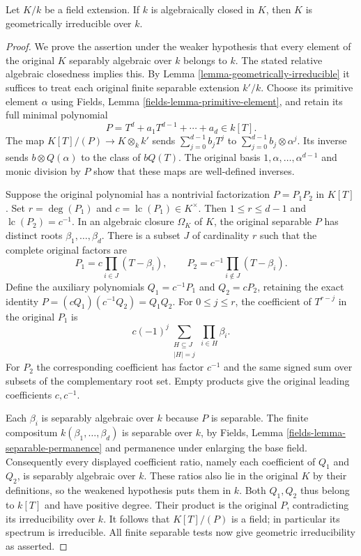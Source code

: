 \begin{lemma}
\label{lemma-field-extension-geometrically-irreducible}
Let $K/k$ be a field extension. If $k$ is algebraically closed in $K$, then
$K$ is geometrically irreducible over $k$.
\end{lemma}

\begin{proof}
We prove the assertion under the weaker
hypothesis that every element of the
original $K$ separably algebraic over
$k$ belongs to $k$. The stated relative
algebraic closedness implies this.
By Lemma \ref{lemma-geometrically-irreducible}
it suffices to treat each original
finite separable extension $k'/k$.
Choose its primitive element $\alpha$
using Fields, Lemma
\ref{fields-lemma-primitive-element},
and retain its full minimal polynomial
$$
P=T^d+a_1T^{d-1}+\cdots+a_d\in k[T].
$$
The map $K[T]/(P)\to K\otimes_k k'$
sends $\sum_{j=0}^{d-1}b_jT^j$ to
$\sum_{j=0}^{d-1}b_j\otimes\alpha^j$.
Its inverse sends $b\otimes Q(\alpha)$
to the class of $bQ(T)$.
The original basis $1,\alpha,\ldots,\alpha^{d-1}$
and monic division by $P$ show that
these maps are well-defined inverses.

Suppose the original polynomial has
a nontrivial factorization $P=P_1P_2$
in $K[T]$. Set $r=\deg(P_1)$ and
$c=\operatorname{lc}(P_1)\in K^\times$.
Then $1\leq r\leq d-1$ and
$\operatorname{lc}(P_2)=c^{-1}$.
In an algebraic closure $\Omega_K$ of
$K$, the original separable $P$ has
distinct roots $\beta_1,\ldots,\beta_d$.
There is a subset $J$ of cardinality
$r$ such that the complete original
factors are
$$
P_1=c\prod_{i\in J}(T-\beta_i),\qquad
P_2=c^{-1}\prod_{i\notin J}(T-\beta_i).
$$
Define the auxiliary polynomials
$Q_1=c^{-1}P_1$ and $Q_2=cP_2$,
retaining the exact identity
$P=(cQ_1)(c^{-1}Q_2)=Q_1Q_2$.
For $0\leq j\leq r$, the coefficient
of $T^{r-j}$ in the original $P_1$ is
$$
c(-1)^j\sum_{\substack{H\subseteq J\\|H|=j}}
\prod_{i\in H}\beta_i.
$$
For $P_2$ the corresponding coefficient
has factor $c^{-1}$ and the same signed
sum over subsets of the complementary
root set. Empty products give the
original leading coefficients $c,c^{-1}$.

Each $\beta_i$ is separably algebraic
over $k$ because $P$ is separable.
The finite compositum $k(\beta_1,\ldots,\beta_d)$
is separable over $k$, by Fields,
Lemma \ref{fields-lemma-separable-permanence}
and permanence under enlarging the
base field. Consequently every displayed
coefficient ratio, namely each coefficient
of $Q_1$ and $Q_2$, is separably algebraic
over $k$. These ratios also lie in
the original $K$ by their definitions,
so the weakened hypothesis puts them
in $k$. Both $Q_1,Q_2$ thus belong to
$k[T]$ and have positive degree.
Their product is the original $P$,
contradicting its irreducibility over $k$.
It follows that $K[T]/(P)$ is a field;
in particular its spectrum is irreducible.
All finite separable tests now give
geometric irreducibility as asserted.


\end{proof}

